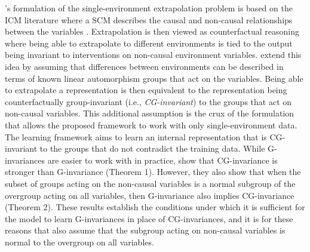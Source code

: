 \citeauthor{Mouli:2021}'s formulation of the single-environment extrapolation problem is based on the ICM literature where a SCM describes the causal and non-causal relationships between the variables \parencite{Scholkopf:2019}. Extrapolation is then viewed as counterfactual reasoning where being able to extrapolate to different environments is tied to the output being invariant to interventions on non-causal environment variables. \citeauthor{Mouli:2021} extend this idea by assuming that differences between environments can be described in terms of known linear automorphism groups that act on the variables. Being able to extrapolate a representation is then equivalent to the representation being counterfactually group-invariant (i.e., \textit{CG-invariant}) to the groups that act on non-causal variables. This additional assumption is the crux of the formulation that allows the proposed framework to work with only single-environment data.
\\

The learning framework aims to learn an internal representation that is CG-invariant to the groups that do not contradict the training data. While G-invariances are easier to work with in practice, \textcite{Mouli:2021} show that CG-invariance is stronger than G-invariance (Theorem 1). However, they also show that when the subset of groups acting on the non-causal variables is a normal subgroup of the overgroup acting on all variables, then G-invariance also implies CG-invariance (Theorem 2). These results establish the conditions under which it is sufficient for the model to learn G-invariances in place of CG-invariances, and it is for these reasons that \citeauthor{Mouli:2021} also assume that the subgroup acting on non-causal variables is normal to the overgroup on all variables.
\\

